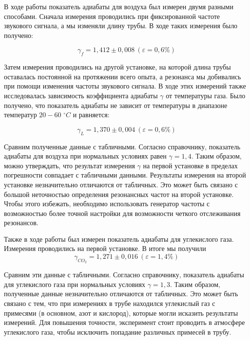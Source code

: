 \documentclass[a4paper,12pt]{article}
\theoremstyle{definition}
\begin{document}
	В ходе работы показатель адиабаты для воздуха был измерен двумя разными способами. Сначала измерения проводились при фиксированной частоте звукового сигнала, а мы изменяли длину трубы. В ходе таких измерения было получено:
	
	\[ \gamma_f = 1,412 \pm 0,008 \ (\varepsilon=0,6\%) \]
	
	Затем измерения проводились на другой установке, на которой длина трубы оставалась постоянной на протяжении всего опыта, а резонанса мы добивались при помощи изменения частоты звукового сигнала. В ходе этих измерений также исследовалась зависимость коэффициента адиабаты $ \gamma $ от температуры газа. Было получено, что показатель адиабаты не зависит от температуры в диапазоне температур $ 20-60 $ $ ^\circ C $ и равняется:
	
	\[ \gamma_L = 1,370 \pm 0,004 \ (\varepsilon=0,6\%) \]
	
	Сравним полученные данные с табличными. Согласно справочнику, показатель адиабаты для воздуха при нормальных условиях равен $ \gamma = 1,4 $. Таким образом, можно утверждать, что результат измерения $ \gamma $ на первой установке в пределах погрешности совпадает с табличными данными. Результаты измерения на второй установке незначительно отличаются от табличных. Это может быть связано с большой неточностью определения резонансных частот на второй установке. Чтобы этого избежать, необходимо использовать генератор частоты с возможностью более точной настройки для возможности четкого отслеживания резонансов.
	
	Также в ходе работы был измерен показатель адиабаты для углекислого газа. Измерения проводились на первой установке. В итоге мы получили \[ {\gamma_{CO_2} = 1,271 \pm 0,016}\ (\varepsilon=1,4\%) \]
	
	Сравним эти данные с табличными. Согласно справочнику, показатель адиабаты для углекислого газа при нормальных условиях $ \gamma = 1,3 $. Таким образом, полученные данные незначительно отличаются от табличных. Это может быть связано с тем, что при измерениях в трубе находился углекислый газ с примесями (в основном, азот и кислород), которые могли исказить результаты измерений. Для повышения точности, эксперимент стоит проводить в атмосфере углекислого газа, чтобы исключить попадание различных примесей в трубу.
	
	
	
	
	
	
\end{document}
